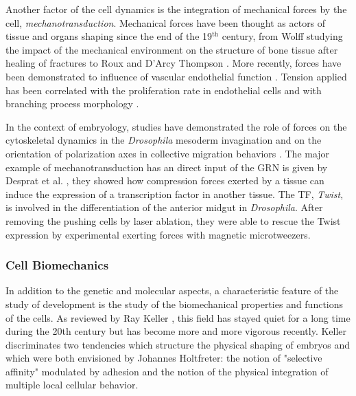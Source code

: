   Another factor of the cell dynamics is the integration of mechanical forces by the cell, \textit{mechanotransduction}\cite{Orr:2006cr}\cite{Jaalouk:2009jn}\cite{Wozniak:2009cu}\cite{Eyckmans:2011fy}. Mechanical forces have been thought as actors of tissue and organs shaping since the end of the 19$^\textrm{th}$ century, from Wolff studying the impact of the mechanical environment on the structure of bone tissue after healing of fractures \cite{wolff1892gesetz} to Roux \cite{Roux:1895vb} and D'Arcy Thompson \cite{thompson1992growth}. More recently, forces have been demonstrated to influence of vascular endothelial function \cite{Franke:1984gc}. Tension applied has been correlated with the proliferation rate in endothelial cells \cite{Nelson:2005dd} and with branching process morphology \cite{Gjorevski:2010gb}. 

  In the context of embryology, studies have demonstrated the role of forces on the cytoskeletal dynamics in the \textit{Drosophila} mesoderm invagination \cite{Martin:2010je}\cite{FernandezGonzalez:2009hp} and on the orientation of polarization axes in collective migration behaviors \cite{Weber:2011hi}. The major example of mechanotransduction has an direct input of the GRN is given by Desprat et al. \cite{Desprat:2008ei}, they showed how compression forces exerted by a tissue can induce the expression of a transcription factor in another tissue. The TF, \textit{Twist}, is involved in the differentiation of the anterior midgut in \textit{Drosophila}. After removing the pushing cells by laser ablation, they were able to rescue the Twist expression by experimental exerting forces with magnetic microtweezers. 


\subsubsection{Cell Biomechanics}


  In addition to the genetic and molecular aspects, a characteristic feature of the study of development is the study of the biomechanical properties and functions of the cells. As reviewed by Ray Keller \cite{Keller:2012ge}, this field has stayed quiet for a long time during the 20th century but has become more and more vigorous recently. Keller discriminates two tendencies which structure the physical shaping of embryos and which were both envisioned by Johannes Holtfreter: the notion of "selective affinity" modulated by adhesion and the notion of the physical integration of multiple local cellular behavior. 

